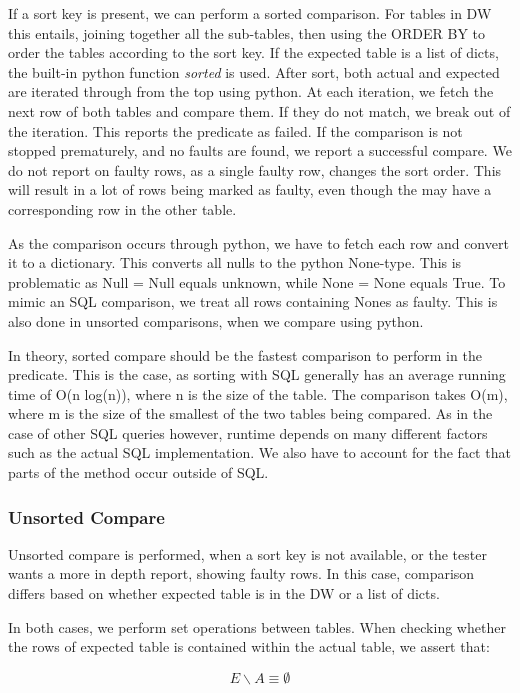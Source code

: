 If a sort key is present, we can perform a sorted comparison.  For tables in DW this entails, joining together all the sub-tables, then using the ORDER BY to order the tables according to the sort key. If the expected table is a list of dicts, the built-in python function \textit{sorted} is used.  After sort, both actual and expected are iterated through from the top using python. At each iteration, we fetch the next row of both tables and compare them. If they do not match, we break out of the iteration. This reports the predicate as failed. If the comparison is not stopped prematurely, and no faults are found, we report a successful compare. We do not report on faulty rows, as a single faulty row, changes the sort order. This will result in a lot of rows being marked as faulty, even though the may have a corresponding row in the other table. 

As the comparison occurs through python, we have to fetch each row and convert it to a dictionary. This converts all nulls to the python None-type. This is problematic as Null = Null equals unknown, while None = None equals True. To mimic an SQL  comparison, we treat all rows containing Nones as faulty. This is also done in unsorted comparisons, when we compare using python. 

In theory, sorted compare should be the fastest comparison to perform in the predicate. This is the case, as sorting with SQL generally has an average running time of O(n log(n)), where n is the size of the table. The comparison takes O(m), where m is the size of the smallest of the two tables being compared.  As in the case of other SQL queries however, runtime depends on many different factors such as the actual SQL implementation. We also have to account for the fact that parts of the method occur outside of SQL. 

\subsubsection{Unsorted Compare}
Unsorted compare is performed, when a sort key is not available, or the tester wants a more in depth report, showing faulty rows. In this case, comparison differs based on whether expected table is in the DW or a list of dicts. 

In both cases, we perform set operations between tables. When checking whether the rows of expected table is contained within the actual table, we assert that:

\[ E \backslash A \equiv \emptyset \]

